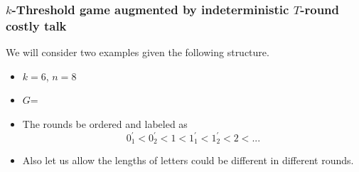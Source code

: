 \documentclass[9pt]{beamer}
\begin{document}
\begin{frame}
  \frametitle{$k$-Threshold game augmented by indeterministic $T$-round costly talk}
  We will consider two examples given the following structure.
\begin{itemize}
\item $k=6$, $n=8$
\item $G$=
\begin{center}
\end{center}
\end{itemize}

\begin{itemize}
\item The rounds be ordered and labeled as \[0^{'}_1<0^{'}_{2}<1<1^{'}_{1}<1^{'}_{2}<2<...\]
\item Also let us allow the lengths of letters could be different in different rounds.
\end{itemize}

\end{frame}
\end{document}
